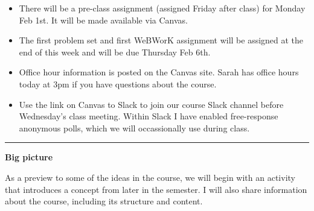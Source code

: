 \documentclass[12pt,letterpaper,noanswers]{exam}
\begin{document}
\eject


    
    


\eject



\begin{itemize}
\itemsep0em
    \item There will be a pre-class assignment (assigned Friday after class) for Monday Feb 1st.  It will be made available via Canvas.
    \item The first problem set and first WeBWorK assignment will be assigned at the end of this week and will be due Thursday Feb 6th.
    \item Office hour information is posted on the Canvas site.  Sarah has office hours today at 3pm if you have questions about the course.
    \item Use the link on Canvas to Slack to join our course Slack channel before Wednesday's class meeting.  Within Slack I have enabled free-response anonymous polls, which we will occassionally use during class.
\end{itemize}

\hrule
\vspace{0.2cm}



\noindent\textbf{Big picture}

As a preview to some of the ideas in the course, we will begin with an activity that introduces a concept from later in the semester.  I will also share information about the course, including its structure and content.
\end{document}
